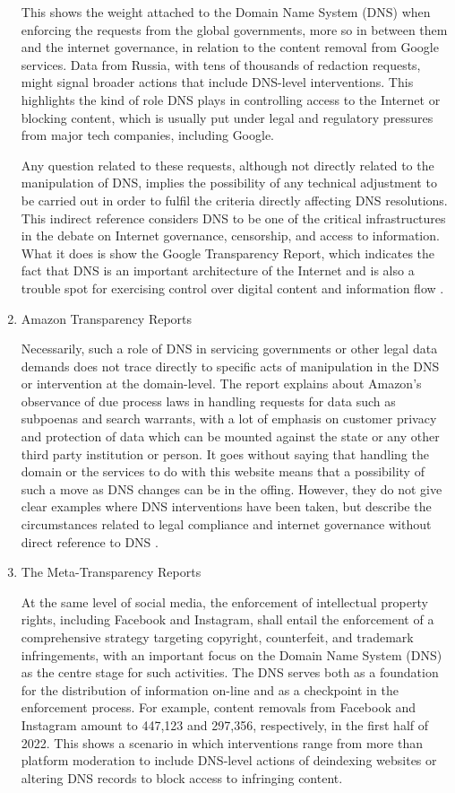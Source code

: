 \begin{enumerate}
This shows the weight attached to the Domain Name System (DNS) when enforcing the requests from the global governments, more so in between them and the internet governance, in relation to the content removal from Google services. Data from Russia, with tens of thousands of redaction requests, might signal broader actions that include DNS-level interventions. This highlights the kind of role DNS plays in controlling access to the Internet or blocking content, which is usually put under legal and regulatory pressures from major tech companies, including Google.

Any question related to these requests, although not directly related to the manipulation of DNS, implies the possibility of any technical adjustment to be carried out in order to fulfil the criteria directly affecting DNS resolutions. This indirect reference considers DNS to be one of the critical infrastructures in the debate on Internet governance, censorship, and access to information. What it does is show the Google Transparency Report, which indicates the fact that DNS is an important architecture of the Internet and is also a trouble spot for exercising control over digital content and information flow \cite{Google2023}.

\item Amazon Transparency Reports 

Necessarily, such a role of DNS in servicing governments or other legal data demands does not trace directly to specific acts of manipulation in the DNS or intervention at the domain-level. The report explains about Amazon's observance of due process laws in handling requests for data such as subpoenas and search warrants, with a lot of emphasis on customer privacy and protection of data which can be mounted against the state or any other third party institution or person. It goes without saying that handling the domain or the services to do with this website means that a possibility of such a move as DNS changes can be in the offing. However, they do not give clear examples where DNS interventions have been taken, but describe the circumstances related to legal compliance and internet governance without direct reference to DNS \cite{Amazon2023}.

\item The Meta-Transparency Reports

At the same level of social media, the enforcement of intellectual property rights, including Facebook and Instagram, shall entail the enforcement of a comprehensive strategy targeting copyright, counterfeit, and trademark infringements, with an important focus on the Domain Name System (DNS) as the centre stage for such activities. The DNS serves both as a foundation for the distribution of information on-line and as a checkpoint in the enforcement process. For example, content removals from Facebook and Instagram amount to 447,123 and 297,356, respectively, in the first half of 2022. This shows a scenario in which interventions range from more than platform moderation to include DNS-level actions of deindexing websites or altering DNS records to block access to infringing content.


\end{enumerate}
